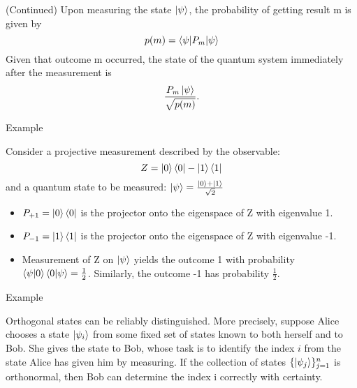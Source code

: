\documentclass[handout, 10 pt]{beamer}
\begin{document}
\begin{frame}{(Continued)}
    Upon measuring the state $\ket{\psi}$, the probability of getting result m is given by 
    \begin{equation}
        p(m)=\braket{\psi|P_m|\psi}
    \end{equation}
    Given that outcome m occurred, the state of the quantum system immediately after the measurement is 
    \begin{equation}
        \frac{P_m \ket{\psi}}{\sqrt{p(m)}}.
    \end{equation}
\end{frame}



\begin{frame}{Example}
\begin{block}{}
    Consider a projective measurement described by the observable: \begin{equation}
    Z=\ket{0}\bra{0}-\ket{1}\bra{1}
    \end{equation}
    and a quantum state to be measured:
        $\ket{\psi}=\frac{\ket{0}+\ket{1}}{\sqrt{2}}$
\end{block}
\pause
\begin{itemize}
    \item $P_{+1}=\ket{0}\bra{0}$ is the projector onto the eigenspace of Z with eigenvalue 1.
    \pause
    \item $P_{-1}=\ket{1}\bra{1}$ is the projector onto the eigenspace of Z with eigenvalue -1.
    \pause
    \item Measurement of Z on $\ket{\psi}$ yields the outcome 1 with probability $\braket{\psi|0}\braket{0|\psi}=\frac{1}{2}$. Similarly, the outcome -1 has probability $\frac{1}{2}$.
\end{itemize}
\end{frame}

\begin{frame}{Example}
\begin{block}{}
Orthogonal states can be reliably distinguished. More precisely, suppose Alice chooses a state $\ket{\psi_i}$ from some fixed set of states known to both herself and to Bob. She gives the state to Bob, whose task is to identify the index $i$ from the state Alice has given him by measuring. If the collection of states $\{\ket{\psi_j}\}_{j=1}^n$ is orthonormal, then Bob can determine the index i correctly with certainty.
\end{block}
\end{frame}
\end{document}
